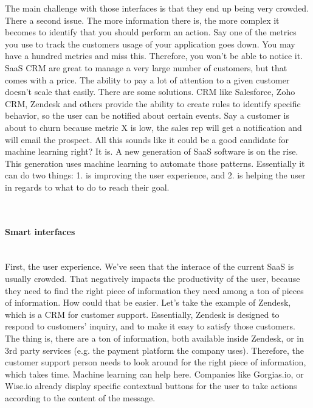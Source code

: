\documentclass[12pt]{article}
\begin{document}
The main challenge with those interfaces is that they end up being very crowded. There a second issue. The more information there is, the more complex it becomes to identify that you should perform an action. Say one of the metrics you use to track the customers usage of your application goes down. You may have a hundred metrics and miss this. Therefore, you won't be able to notice it. 
SaaS CRM are great to manage a very large number of customers, but that comes with a price. The ability to pay a lot of attention to a given customer doesn't scale that easily.
There are some solutions. CRM like Salesforce, Zoho CRM, Zendesk and others provide the ability to create rules to identify specific behavior, so the user can be notified about certain events. Say a customer is about to churn because metric X is low, the sales rep will get a notification and will email the prospect. 
All this sounds like it could be a good candidate for machine learning right? It is. A new generation of SaaS software is on the rise. This generation uses machine learning to automate those patterns. Essentially it can do two things: 1. is improving the user experience, and 2. is helping the user in regards to what to do to reach their goal. 

\\
\paragraph{Smart interfaces}
\\

First, the user experience. We've seen that the interace of the current SaaS is usually crowded. That negatively impacts the productivity of the user, because they need to find the right piece of information they need among a ton of pieces of information. How could that be easier. Let's take the example of Zendesk, which is a CRM for customer support. Essentially, Zendesk is designed to respond to customers' inquiry, and to make it easy to satisfy those customers. The thing is, there are a ton of information, both available inside Zendesk, or in 3rd party services (e.g. the payment platform the company uses). Therefore, the customer support person needs to look around for the right piece of information, which takes time. Machine learning can help here. Companies like Gorgias.io, or Wise.io already display specific contextual buttons for the user to take actions according to the content of the message. 
\end{document}
